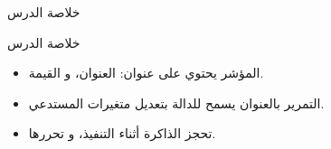 \documentclass[aspectratio=169, 11pt, t, xcolor={table}]{beamer}
\begin{document}
\begin{frame}{خلاصة الدرس}
    \begin{tbox}{\faCheckCircle\quad خلاصة الدرس}
        \begin{itemize}
            \item المؤشر يحتوي على عنوان:  العنوان، و القيمة.
            \item التمرير بالعنوان يسمح للدالة بتعديل متغيرات المستدعي.
            \item {} تحجز الذاكرة أثناء التنفيذ، و تحررها.
        \end{itemize}
    \end{tbox}
\end{frame}
\end{document}
